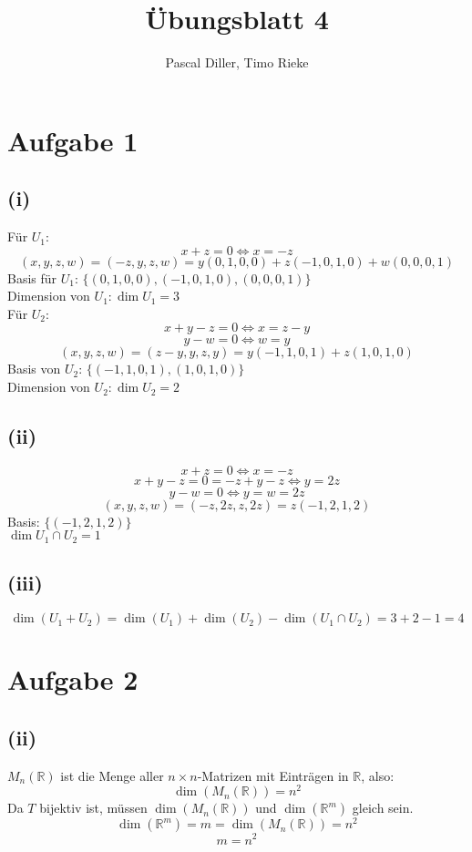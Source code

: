 \documentclass{article}
\title{Übungsblatt 4}
\author{Pascal Diller, Timo Rieke}
\begin{document}
\maketitle

\section*{Aufgabe 1}
\subsection*{(i)}
Für $U_1$: \\
\[x + z = 0 \Longleftrightarrow x = -z\]
\[(x,y,z,w) = (-z, y, z, w) = y(0,1,0,0) + z(-1,0,1,0) + w(0,0,0,1)\]
Basis für $U_1$: $\{(0,1,0,0), (-1,0,1,0),(0,0,0,1)\}$ \\
Dimension von $U_1: \dim{U_1} = 3$ \\
\newline
Für $U_2$: \\
\[x+y-z = 0 \Longleftrightarrow x = z - y\]
\[y-w = 0 \Longleftrightarrow w = y\]
\[(x,y,z,w) = (z - y, y, z , y) = y(-1,1,0,1) + z(1,0,1,0)\]
Basis von $U_2$: $\{(-1, 1, 0, 1), (1,0,1,0)\}$ \\
Dimension von $U_2: \dim{U_2} = 2$

\subsection*{(ii)}
\[x+z = 0 \Longleftrightarrow x = -z\]
\[x+y-z = 0 = -z + y -z \Longleftrightarrow y = 2z\]
\[y - w = 0 \Longleftrightarrow y = w = 2z\]
\[(x,y,z,w) = (-z,2z,z,2z) = z(-1,2,1,2)\]
Basis: $\{(-1,2,1,2)\}$ \\
$\dim{U_1 \cap U_2} = 1$

\subsection*{(iii)}
\[\dim{(U_1 + U_2)} = \dim{(U_1)} + \dim{(U_2)} - \dim{(U_1 \cap U_2)} = 3 + 2 - 1 = 4\]

\section*{Aufgabe 2}
\subsection*{(ii)}
$M_n(\mathbb{R})$ ist die Menge aller $n \times n$-Matrizen mit Einträgen in $\mathbb{R}$, also:
\[\dim(M_n(\mathbb{R})) = n^2\]
Da $T$ bijektiv ist, müssen $\dim(M_n(\mathbb{R}))$ und $\dim(\mathbb{R}^m)$ gleich sein.
\[\dim(\mathbb{R}^m) = m = \dim(M_n(\mathbb{R})) = n^2\]
\[m = n^2\]
\end{document}
